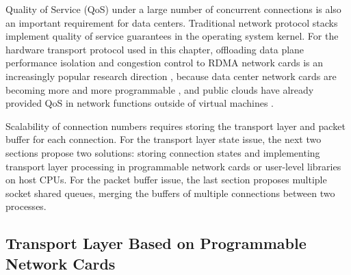 Quality of Service (QoS) under a large number of concurrent connections is also an important requirement for data centers.
Traditional network protocol stacks implement quality of service guarantees in the operating system kernel.
For the hardware transport protocol used in this chapter, offloading data plane performance isolation and congestion control to RDMA network cards is an increasingly popular research direction \cite {peter2016arrakis,zhu2015congestion,lu2017memory,mprdma,mittal2018revisiting}, because data center network cards are becoming more and more programmable  \cite{smartnic,cavium,kaufmann2015flexnic,mellanox-innova,mellanox-bluefield}, and public clouds have already provided QoS in network functions outside of virtual machines \cite {li2016clicknp,panda2016netbricks,floem-osdi18}.

Scalability of connection numbers requires storing the transport layer and packet buffer for each connection. For the transport layer state issue, the next two sections propose two solutions: storing connection states and implementing transport layer processing in programmable network cards or user-level libraries on host CPUs. For the packet buffer issue, the last section proposes multiple socket shared queues, merging the buffers of multiple connections between two processes.

\subsection{Transport Layer Based on Programmable Network Cards}
\label{socksdirect:sec:smartnic}



